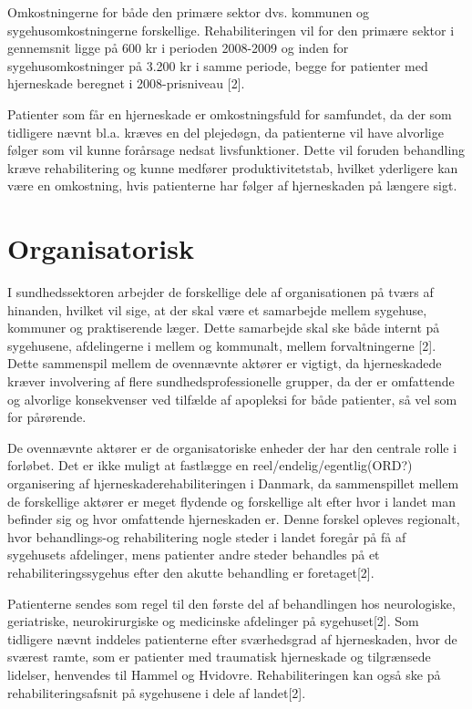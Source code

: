 Omkostningerne for både den primære sektor dvs. kommunen og sygehusomkostningerne forskellige. Rehabiliteringen vil for den primære sektor i gennemsnit ligge på 600 kr i perioden 2008-2009 og inden for sygehusomkostninger på 3.200 kr i samme periode, begge for patienter med hjerneskade beregnet i 2008-prisniveau [2].

Patienter som får en hjerneskade er omkostningsfuld for samfundet, da der som tidligere nævnt bl.a. kræves en del plejedøgn, da patienterne vil have alvorlige følger som vil kunne forårsage nedsat livsfunktioner. Dette vil foruden behandling kræve rehabilitering og kunne medfører produktivitetstab, hvilket yderligere kan være en omkostning, hvis patienterne har følger af hjerneskaden på længere sigt.


\section{Organisatorisk}
I sundhedssektoren arbejder de forskellige dele af organisationen på tværs af hinanden, hvilket vil sige, at der skal være et samarbejde mellem sygehuse, kommuner og praktiserende læger. Dette samarbejde skal ske både internt på sygehusene, afdelingerne i mellem og kommunalt, mellem forvaltningerne [2]. Dette sammenspil mellem de ovennævnte aktører er vigtigt, da hjerneskadede kræver involvering af flere sundhedsprofessionelle grupper, da der er omfattende og alvorlige konsekvenser ved tilfælde af apopleksi for både patienter, så vel som for pårørende. 

De ovennævnte aktører er de organisatoriske enheder der har den centrale rolle i forløbet. Det er ikke muligt at fastlægge en reel/endelig/egentlig(ORD?) organisering af hjerneskaderehabiliteringen i Danmark, da sammenspillet mellem de forskellige aktører er meget flydende og forskellige alt efter hvor i landet man befinder sig og hvor omfattende hjerneskaden er. Denne forskel opleves regionalt, hvor behandlings-og rehabilitering nogle steder i landet foregår på få af sygehusets afdelinger, mens patienter andre steder behandles på et rehabiliteringssygehus efter den akutte behandling er foretaget[2]. 

Patienterne sendes som regel til den første del af behandlingen hos neurologiske, geriatriske, neurokirurgiske og medicinske afdelinger på sygehuset[2]. Som tidligere nævnt inddeles patienterne  efter sværhedsgrad af hjerneskaden, hvor de sværest ramte, som er patienter med traumatisk hjerneskade og tilgrænsede lidelser, henvendes til Hammel og Hvidovre. Rehabiliteringen kan også ske på rehabiliteringsafsnit på sygehusene i dele af landet[2]. 

